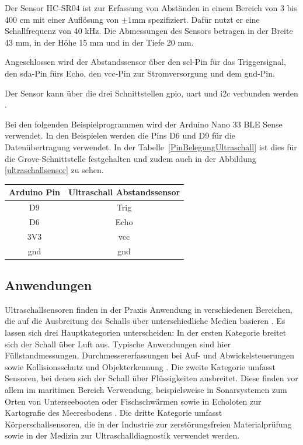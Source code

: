  Der Sensor HC-SR04 ist  zur Erfassung von Abständen in einem Bereich von 3 bis 400 cm mit einer Auflösung von $\pm 1$mm spezifiziert. Dafür nutzt er eine Schallfrequenz von 40 kHz.   Die Abmessungen des Sensors betragen in der Breite 43 mm, in der Höhe 15 mm und in der Tiefe 20 mm. 
 
 Angeschlossen wird der Abstandssensor über den \ac{scl}-Pin für das Triggersignal, den \ac{sda}-Pin fürs Echo, den \ac{vcc}-Pin zur Stromversorgung und dem \ac{gnd}-Pin. 
 
 Der Sensor kann über die drei Schnittstellen \ac{gpio}, \ac{uart} und \ac{i2c} verbunden werden \cite{Simac:2017}. 


Bei den folgenden Beispielprogrammen wird der Arduino Nano 33 BLE Sense verwendet. In den Beispielen werden die Pins D6 und D9 für die Datenübertragung verwendet. In der Tabelle~\ref{PinBelegungUltraschall}  ist dies für die Grove-Schnittstelle festgehalten und zudem auch in der Abbildung \ref{ultraschallsensor} zu sehen.

    \begin{center}
        \begin{tabular}{c|c}
            Arduino Pin & Ultraschall Abstandssensor\\ \hline
            D9 & Trig\\
            D6 & Echo\\
            3V3 & \acs{vcc}\\
            \acs{gnd} & \acs{gnd}\\
        \end{tabular}
        \label{PinBelegungUltraschall}
    \end{center}

\subsection{Anwendungen}
Ultraschallsensoren finden in der Praxis Anwendung in verschiedenen Bereichen, die auf die Ausbreitung des Schalls über unterschiedliche Medien basieren \cite{Hering:2023}. Es lassen sich drei Hauptkategorien unterscheiden: In der ersten Kategorie breitet sich der Schall über Luft aus. Typische Anwendungen sind hier Füllstandmessungen, Durchmessererfassungen bei Auf- und Abwickelsteuerungen sowie Kollisionsschutz und Objekterkennung \cite{Hering:2023}. Die zweite Kategorie umfasst Sensoren, bei denen sich der Schall über Flüssigkeiten ausbreitet. Diese finden vor allem im maritimen Bereich Verwendung, beispielsweise in Sonarsystemen zum Orten von Unterseebooten oder Fischschwärmen sowie in Echoloten zur Kartografie des Meeresbodens \cite{Hering:2021}. Die dritte Kategorie umfasst Körperschallsensoren, die in der Industrie zur zerstörungsfreien Materialprüfung sowie in der Medizin zur Ultraschalldiagnostik verwendet werden. \cite{Hering:2021}


